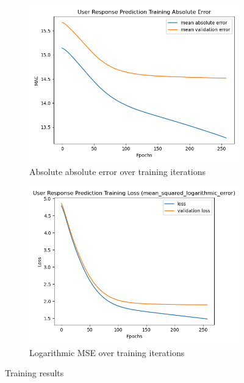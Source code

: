 \documentclass[acmsmall]{acmart}
\begin{document}
\begin{figure}[H]
\centering
\begin{subfigure}{.5\textwidth}
\centering
  \includegraphics[width=.9\linewidth]{assets/User_Response_Prediction_Training_Absolute_Error.png} 
  \caption{Absolute absolute error over training iterations}
 \end{subfigure}%
\begin{subfigure}{.5\textwidth}
\centering
  \includegraphics[width=.9\linewidth]{assets/User_Response_Prediction_Training_Loss_mean_squared_logarithmic_error_.png}
  \caption{Logarithmic MSE over training iterations}
 \end{subfigure}
 \caption{Training results}
\label{fig:training_results}
\end{figure}
\end{document}
